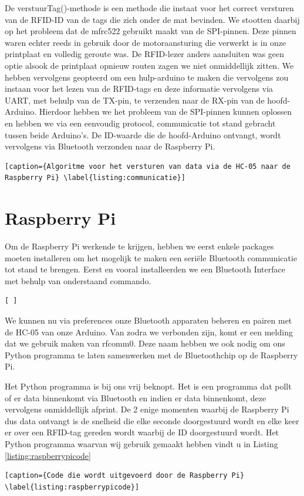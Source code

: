 De verstuurTag()-methode is een methode die instaat voor het correct versturen van de RFID-ID van de tags die zich onder de mat bevinden. We stootten daarbij op het probleem dat de mfrc522 gebruikt maakt van de SPI-pinnen. Deze pinnen waren echter reeds in gebruik door de motoraansturing die verwerkt is in onze printplaat en volledig geroute was. De RFID-lezer anders aansluiten was geen optie alsook de printplaat opnieuw routen zagen we niet onmiddellijk zitten. We hebben vervolgens geopteerd om een hulp-arduino te maken die vervolgens zou instaan voor het lezen van de RFID-tags en deze informatie vervolgens via UART, met behulp van de TX-pin, te verzenden naar de RX-pin van de hoofd-Arduino. Hierdoor hebben we het probleem van de SPI-pinnen kunnen oplossen en hebben we via een eenvoudig protocol, communicatie tot stand gebracht tussen beide Arduino's. De ID-waarde die de hoofd-Arduino ontvangt, wordt vervolgens via Bluetooth verzonden naar de Raspberry Pi.


\begin{lstlisting}[caption={Algoritme voor het versturen van data via de HC-05 naar de Raspberry Pi} \label{listing:communicatie}]
\end{lstlisting}

\section{Raspberry Pi}


Om de Raspberry Pi werkende te krijgen, hebben we eerst enkele packages moeten installeren om het mogelijk te maken een seri\"ele Bluetooth communicatie tot stand te brengen. Eerst en vooral installeerden we een Bluetooth Interface met behulp van onderstaand commando.


\begin{lstlisting}[ ]
\end{lstlisting}

We kunnen nu via preferences onze Bluetooth apparaten beheren en pairen met de HC-05 van onze Arduino. Van zodra we verbonden zijn, komt er een melding dat we gebruik maken van rfcomm0. Deze naam hebben we ook nodig om ons Python programma te laten samenwerken met de Bluetoothchip op de Raspberry Pi. 

Het Python programma is bij ons vrij beknopt. Het is een programma dat pollt of er data binnenkomt via Bluetooth en indien er data binnenkomt, deze vervolgens onmiddellijk afprint. De 2 enige momenten waarbij de Raspberry Pi dus data ontvangt is de snelheid die elke seconde doorgestuurd wordt en elke keer er over een RFID-tag gereden wordt waarbij de ID doorgestuurd wordt. Het Python programma waarvan wij gebruik gemaakt hebben vindt u in Listing \ref{listing:raspberrypicode}



\begin{lstlisting}[caption={Code die wordt uitgevoerd door de Raspberry Pi} \label{listing:raspberrypicode}]
\end{lstlisting}



